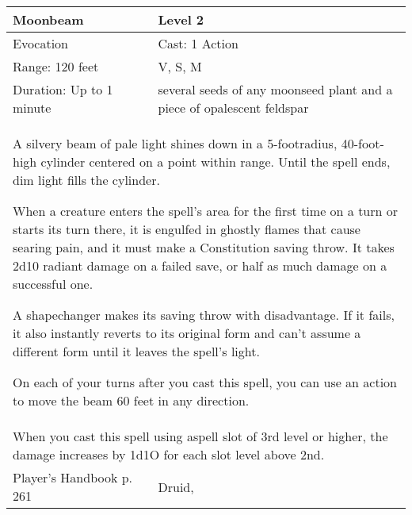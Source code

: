 \documentclass[11pt]{report}
\begin{document}
\begin{table}[H]
	\begin{tabular}{||p{6cm}|p{6cm}||}
		\hline\hline
		\bf{Moonbeam} & Level 2\\ \hline
		Evocation & Cast: 1 Action\\ \hline
		Range: 120 feet & V, S, M\\ \hline
		Duration: Up to 1 minute & several seeds of any moonseed plant and a piece of opalescent feldspar\\ \hline
		\multicolumn{2}{||p{12cm}||}{A silvery beam of pale light shines down in a 5-footradius, 40-foot-high cylinder centered on a point within range. Until the spell ends, dim light fills the cylinder.


When a creature enters the spell’s area for the first time on a turn or starts its turn there, it is engulfed in ghostly flames that cause searing pain, and it must make a Constitution saving throw. It takes 2d10 radiant damage on a failed save, or half as much damage on a successful one.

A shapechanger makes its saving throw with disadvantage. If it fails, it also instantly reverts to its original form and can’t assume a different form until it leaves the spell’s light.

On each of your turns after you cast this spell, you can use an action to move the beam 60 feet in any direction.}\\ \hline
		\multicolumn{2}{||p{12cm}||}{When you cast this spell using aspell slot of 3rd level or higher, the damage increases by 1d1O for each slot level above 2nd.}\\ \hline
Player's Handbook p. 261 & Druid, \\ \hline\hline
	\end{tabular}
\end{table}
\end{document}
